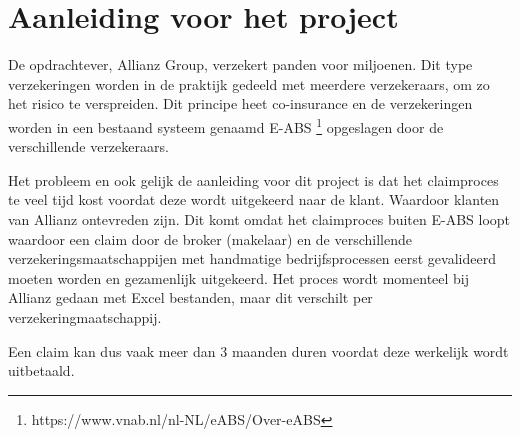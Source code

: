 \chapter{Aanleiding voor het project}
De opdrachtever, Allianz Group, verzekert panden voor miljoenen. Dit type verzekeringen worden in de praktijk gedeeld met meerdere verzekeraars, om zo het risico te verspreiden. Dit principe heet co-insurance en de verzekeringen worden in een bestaand systeem genaamd E-ABS \footnote{https://www.vnab.nl/nl-NL/eABS/Over-eABS} opgeslagen door de verschillende verzekeraars.\par

Het probleem en ook gelijk de aanleiding voor dit project is dat het claimproces te veel tijd kost voordat deze wordt uitgekeerd naar de klant. Waardoor klanten van Allianz ontevreden zijn. Dit komt omdat het claimproces buiten E-ABS loopt waardoor een claim door de broker (makelaar) en de verschillende verzekeringsmaatschappijen met handmatige bedrijfsprocessen eerst gevalideerd moeten worden en gezamenlijk uitgekeerd. Het proces wordt momenteel bij Allianz gedaan met Excel bestanden, maar dit verschilt per verzekeringmaatschappij.\par

 Een claim kan dus vaak meer dan 3 maanden duren voordat deze werkelijk wordt uitbetaald.
